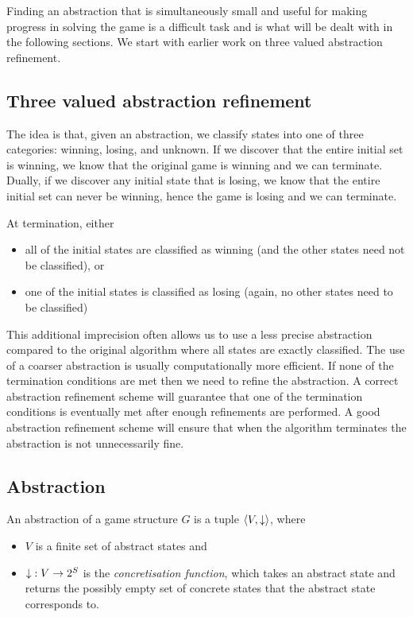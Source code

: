 Finding an abstraction that is simultaneously small and useful for making progress in solving the game is a difficult task and is what will be dealt with in the following sections. We start with earlier work on three valued abstraction refinement. 

\subsection{Three valued abstraction refinement}
\label{sec:three_val_abs_ref}

The idea is that, given an abstraction, we classify states into one of three categories: winning, losing, and unknown. If we discover that the entire initial set is winning, we know that the original game is winning and we can terminate. Dually, if we discover any initial state that is losing, we know that the entire initial set can never be winning, hence the game is losing and we can terminate. 

At termination, either 
\begin{itemize}
\item all of the initial states are classified as winning (and the other states need not be classified), or
\item one of the initial states is classified as losing (again, no other states need to be classified)
\end{itemize}

This additional imprecision often allows us to use a less precise abstraction compared to the original algorithm where all states are exactly classified. The use of a coarser abstraction is usually computationally more efficient. If none of the termination conditions are met then we need to refine the abstraction. A correct abstraction refinement scheme will guarantee that one of the termination conditions is eventually met after enough refinements are performed. A good abstraction refinement scheme will ensure that when the algorithm terminates the abstraction is not unnecessarily fine.

\subsection{Abstraction}
\label{sec:abstraction_def}

An abstraction of a game structure $G$ is a tuple $\langle V, \mathord{\downarrow}\rangle$, where 
\begin{itemize}
    \item $V$ is a finite set of abstract states and 
    \item $\mathord{\downarrow} : V \rightarrow 2^S $ is the \emph{concretisation function}, which takes an abstract state and returns the possibly empty set of concrete states that the abstract state corresponds to.  
\end{itemize}
        
